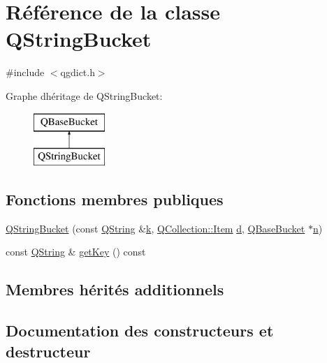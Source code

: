 \hypertarget{class_q_string_bucket}{}\section{Référence de la classe Q\+String\+Bucket}
\label{class_q_string_bucket}


{\ttfamily \#include $<$qgdict.\+h$>$}

Graphe d\textquotesingle{}héritage de Q\+String\+Bucket\+:\begin{figure}[H]
\begin{center}
\leavevmode
\includegraphics[height=2.000000cm]{class_q_string_bucket}
\end{center}
\end{figure}
\subsection*{Fonctions membres publiques}
\begin{DoxyCompactItemize}
\item 
\hyperlink{class_q_string_bucket_ab73eda6e5bef856c855183f66fe6a764}{Q\+String\+Bucket} (const \hyperlink{class_q_string}{Q\+String} \&\hyperlink{060__command__switch_8tcl_a20363f854eb4098a446733d63d34dbc1}{k}, \hyperlink{class_q_collection_ac6f3ddbf999e31fb797927f71ae6b5d7}{Q\+Collection\+::\+Item} \hyperlink{060__command__switch_8tcl_af43f4b1f0064a33b2d662af9f06d3a00}{d}, \hyperlink{class_q_base_bucket}{Q\+Base\+Bucket} $\ast$\hyperlink{060__command__switch_8tcl_acdde3cd86eb2421ce8dbb2e85227d368}{n})
\item 
const \hyperlink{class_q_string}{Q\+String} \& \hyperlink{class_q_string_bucket_a32776e2490c350f5e825071c24ae80d2}{get\+Key} () const 
\end{DoxyCompactItemize}
\subsection*{Membres hérités additionnels}


\subsection{Documentation des constructeurs et destructeur}
\hypertarget{class_q_string_bucket_ab73eda6e5bef856c855183f66fe6a764}{}
